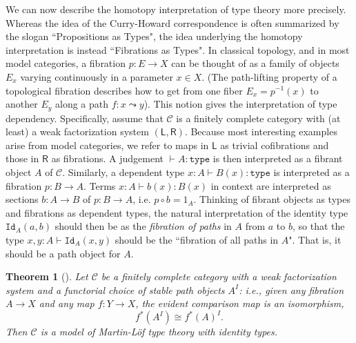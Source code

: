 \documentclass[reqno,12pt]{amsart}
\renewcommand{\to}{\rightarrow}
\renewcommand{\L}{\ensuremath{\mathsf{L}}}
\newcommand{\R}{\ensuremath{\mathsf{R}}}
\newcommand{\C}{\ensuremath{\mathcal{C}}}
\newcommand{\type}{\texttt{type}}
\newcommand{\id}[1]{\texttt{Id}_{#1}}
\newtheorem{theorem}{Theorem}[section]
\theoremstyle{definition}
\theoremstyle{remark}
\begin{document}
We can now describe the homotopy interpretation of type theory more precisely. Whereas the idea of the Curry-Howard correspondence is often summarized by the slogan ``Propositions as Types", the idea underlying the homotopy interpretation is instead
``Fibrations as Types".  In classical topology, and in most model categories, a fibration $p : E\to X$ can be thought of as a family of objects $E_x$ varying continuously in a parameter $x\in X$. (The path-lifting property of a topological fibration describes how to get from one fiber $E_x = p^{-1}(x)$ to another $E_y$ along a path $f:x\leadsto y$).  This notion gives the interpretation of type dependency. 
Specifically, assume that  $\C$ is a finitely complete category with (at least) a weak factorization system $(\L, \R)$. Because most interesting examples arise from model categories, we refer to maps in $\L$ as trivial cofibrations and those in $\R$ as fibrations. A judgement $\vdash A : \type$ is then interpreted as a fibrant object $A$ of $\C$. Similarly, a dependent type $x : A\vdash B(x) : \type$ is interpreted as a fibration $p: B\to A$. Terms $ x: A\vdash b(x): B(x)$ in context are interpreted as sections $b:A\to B$ of $p: B\to A$, i.e. $p\circ b = 1_A$.  Thinking of fibrant objects as types and fibrations as dependent types, the natural interpretation of the identity type $\id{A}(a, b)$ should then be as the  \emph{fibration of paths} in $A$ from $a$ to $b$, so that the type $x,y:A\vdash \id{A}(x,y)$ should be the ``fibration of all paths in $A$". That is, it should be a path object for $A$. 
%

\begin{theorem}[\cite{Awodey:HMIT}]
Let $\C$ be a finitely complete category with a weak factorization system and a functorial choice of \emph{stable} path objects $A^I$:
i.e., given any fibration $A\to X$ and any map $f : Y\to X$, the evident comparison map is an isomorphism,
\[
f^*(A^I)\cong f^*(A)^I.
\]
Then $\C$ is a model of Martin-L\"of type theory with identity types. 
\end{theorem}
\end{document}
